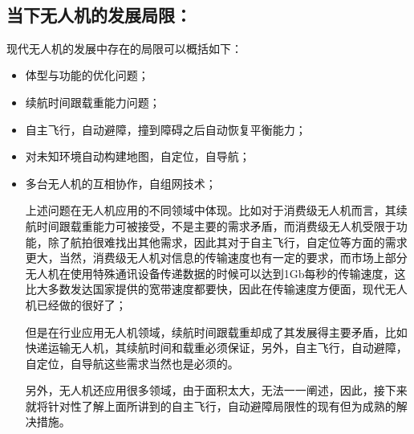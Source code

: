 \documentclass{article}
\begin{document}
\subsection{当下无人机的发展局限：\citep{3}}\par
现代无人机的发展中存在的局限可以概括如下：\par
\begin{itemize}

    \item 体型与功能的优化问题；\par
    \item 续航时间跟载重能力问题；\par
    \item 自主飞行，自动避障，撞到障碍之后自动恢复平衡能力；\par
    \item 对未知环境自动构建地图，自定位，自导航；\par
    \item 多台无人机的互相协作，自组网技术；\par
上述问题在无人机应用的不同领域中体现。比如对于消费级无人机而言，其续航时间跟载重能力可被接受，不是主要的需求矛盾，而消费级无人机受限于功能，除了航拍很难找出其他需求，因此其对于自主飞行，自定位等方面的需求更大，当然，消费级无人机对信息的传输速度也有一定的要求，而市场上部分无人机在使用特殊通讯设备传递数据的时候可以达到1Gb每秒的传输速度，这比大多数发达国家提供的宽带速度都要快，因此在传输速度方便面，现代无人机已经做的很好了；\par
但是在行业应用无人机领域，续航时间跟载重却成了其发展得主要矛盾，比如快递运输无人机，其续航时间和载重必须保证，另外，自主飞行，自动避障，自定位，自导航这些需求当然也是必须的。\par
另外，无人机还应用很多领域，由于面积太大，无法一一阐述，因此，接下来就将针对性了解上面所讲到的自主飞行，自动避障局限性的现有但为成熟的解决措施。\par


\end{itemize}
\end{document}

